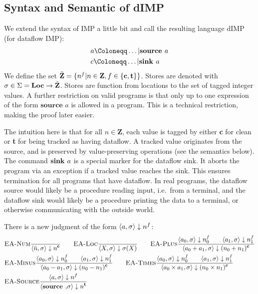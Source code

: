 \subsection{Syntax and Semantic of dIMP}
We extend the syntax of IMP a little bit
and call the resulting language dIMP (for dataflow IMP):
\begin{align*}
    &a \Coloneqq \dots | \defaultsource\\
    &c \Coloneqq \dots | \defaultsink\\
\end{align*}
We define the set $\tilde{\textbf{Z}} =\{\flagged{} | n \in \textbf{Z}, f \in \{\textbf{c}, \textbf{t}\}\}$.
Stores are denoted with $\store \in \Sigma = \Loc \to \tilde{\textbf{Z}}$.
Stores are function from locations to the set of tagged integer
values.
A further restriction on valid programs is that only up to one expression
of the form $\textbf{source } a$ is allowed in a program.
This is a technical restriction, making the proof later easier.

The intuition here is that for all $n \in \textbf{Z}$, 
each value is tagged by either \textbf{c} for clean or \textbf{t} for being tracked
as having dataflow.
A tracked value originates from the source, and is preserved by value-preserving
operations (see the semantics below).
The command $\defaultsink$ is a special marker for the dataflow sink.
It aborts the program via an exception if a tracked value reaches the sink.
This ensures termination for all programs that have dataflow.
In real programs, the dataflow source would likely be a procedure reading input,
i.e.\ from a terminal, and the dataflow sink would likely be a procedure 
printing the data to a terminal, or otherwise communicating with the outside world.


There is a new judgment of the form 
$\bigstep{a}{\sigma}{\flagged{}}$:
\begin{align*}
    &\bsrule{EA-Num}{}{\bigstep{\literalint}{\store}{\clean}} \qquad
    \bsrule{EA-Loc}{}{\bigstep{X}{\store}{\store(X)}}\qquad
    \bsrule{EA-Plus}
    {\bigstep{a_0}{\store}{\flagged[n_0]}
    \qquad \bigstep{a_1}{\store}{\flagged[n_1]}}
    {\bigstep{a_0+a_1}{\store}{\clean[(n_0+n_1)]}}\\
    &\bsrule{EA-Minus}
    {\bigstep{a_0}{\store}{\flagged[n_0]}
    \qquad \bigstep{a_1}{\store}{\flagged[n_1]}}
    {\bigstep{a_0-a_1}{\store}{\clean[(n_0-n_1)]}} \qquad
    \bsrule{EA-Times}
    {\bigstep{a_0}{\store}{\flagged[n_0]}
    \qquad \bigstep{a_1}{\store}{\flagged[n_1]}}
    {\bigstep{a_0 \times a_1}{\store}{\clean[(n_0 \times n_1)]}}\\
    &\bsrule{EA-Source}{\bigstep{a}{\store}{\flagged}}
    {\bigstep{\source}{\store}{\tracked{}}}
\end{align*}

